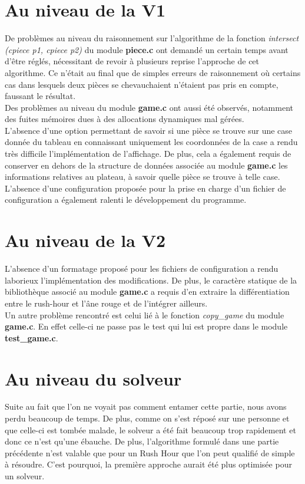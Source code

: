 \documentclass{report}
\begin{document}
\section{Au niveau de la V1}
De problèmes au niveau du raisonnement sur l'algorithme de la fonction \textit{intersect (cpiece p1, cpiece p2)} du module \textbf{piece.c} ont demandé un certain temps avant d'être réglés, nécessitant de revoir à plusieurs reprise l'approche de cet algorithme. Ce n'était au final que de simples erreurs de raisonnement où certains cas dans lesquels deux pièces se chevauchaient n'étaient pas pris en compte, faussant le résultat.\\
Des problèmes au niveau du module \textbf{game.c} ont aussi été observés, notamment des fuites mémoires dues à des allocations dynamiques mal gérées.\\
L'absence d'une option permettant de savoir si une pièce se trouve sur une case donnée du tableau en connaissant uniquement les coordonnées de la case a rendu très difficile l'implémentation de l'affichage.
De plus, cela a également requis de conserver en dehors de la structure de données associée au module \textbf{game.c} les informations relatives au plateau, à savoir quelle pièce se trouve à telle case.\\
L'absence d'une configuration proposée pour la prise en charge d'un fichier de configuration a également ralenti le développement du programme.

\section{Au niveau de la V2}
L'absence d'un formatage proposé pour les fichiers de configuration a rendu laborieux l'implémentation des modifications.
De plus, le caractère statique de la bibliothèque associé au module \textbf{game.c} a requis d'en extraire la différentiation entre le rush-hour et l'âne rouge et de l'intégrer ailleurs.\\
Un autre problème rencontré est celui lié à le fonction \textit{copy\_game} du module \textbf{game.c}. En effet celle-ci ne passe pas le test qui lui est propre dans le module \textbf{test\_game.c}.

\section{Au niveau du solveur}
Suite au fait que l'on ne voyait pas comment entamer cette partie, nous avons perdu beaucoup de temps. De plus, comme on s'est réposé sur une personne et que celle-ci est tombée malade, le solveur a été fait beaucoup trop rapidement et donc ce n'est qu'une ébauche. De plus, l'algorithme formulé dans une partie précédente n'est valable que pour un Rush Hour que l'on peut qualifié de simple à résoudre. C'est pourquoi, la première approche aurait été plus optimisée pour un solveur.
\end{document}
